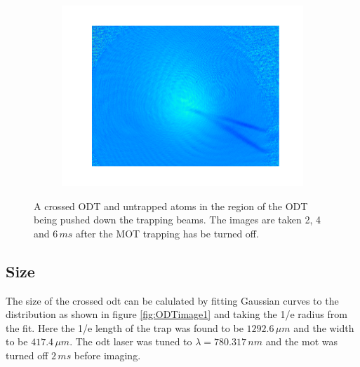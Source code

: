 \begin{figure}
\begin{subfigure}[b]{0.3\textwidth}
        \includegraphics[width=1.1\textwidth]{figs/ODTimage3.pdf}
    \end{subfigure}
\caption{A crossed ODT and untrapped atoms in the region of the ODT being pushed down the trapping beams. The images are taken 2, 4 and $6\,\unit{ms}$ after the MOT trapping has be turned off.}
\label{fig:crossed_effect}
\end{figure}

\subsection{Size}
The size of the crossed \gls{odt} can be calulated by fitting Gaussian curves to the distribution as shown in figure \ref{fig:ODTimage1} and taking the 1/e radius from the fit. Here the 1/e length of the trap was found to be $1292.6\,\unit{\mu m}$ and the width to be $417.4\,\unit{\mu m}$. The \gls{odt} laser was tuned to $\lambda=780.317\,\unit{nm}$ and the \gls{mot} was turned off $2\,\unit{ms}$ before imaging.

